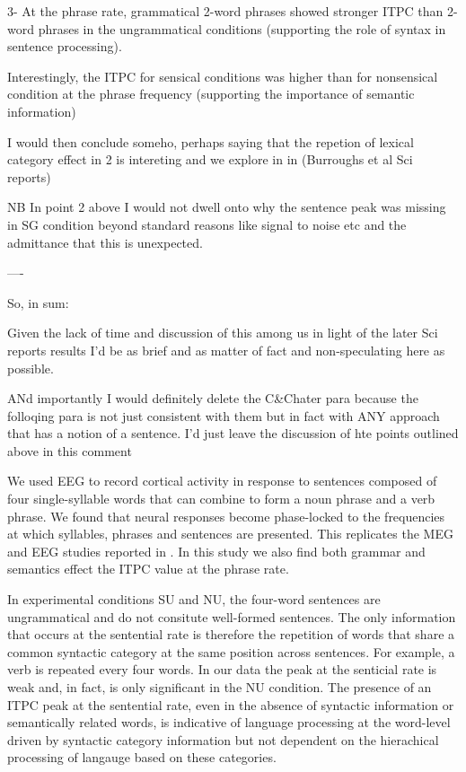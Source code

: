 \documentclass[a4paper,10pt,twoside]{article}
\begin{document}
{3- At the phrase rate, grammatical 2-word
phrases showed stronger ITPC than 2-word phrases in the ungrammatical
conditions (supporting the role of syntax in sentence
processing).

Interestingly, the ITPC for sensical conditions was higher than for
nonsensical condition at the phrase frequency (supporting the
importance of semantic information)

I would then conclude someho,
perhaps saying that the repetion of lexical category effect in 2 is
intereting and we explore in in (Burroughs et al Sci reports)

NB In
point 2 above I would not dwell onto why the sentence peak was missing
in SG condition beyond standard reasons like signal to noise etc and
the admittance that this is unexpected.

----

So, in
sum:

Given the lack of time and discussion of this among us in
light of the later Sci reports results I'd be as brief and as matter
of fact and non-speculating here as possible. 

ANd importantly I
would definitely delete the C&Chater para because the folloqing para
is not just consistent with them but in fact with ANY approach that
has a notion of a sentence.  I'd just leave the discussion of hte
points outlined above in this comment





We used EEG to record cortical activity in response to sentences
composed of four single-syllable words that can combine to form a noun
phrase and a verb phrase. We found that neural responses become
phase-locked to the frequencies at which syllables, phrases and
sentences are presented. This replicates the MEG and EEG studies
reported in \cite{DingEtAl2015,DingEtAl2017}. In this study we also
find both grammar and semantics effect the ITPC value at the phrase
rate.

In experimental conditions SU and NU, the four-word sentences are
ungrammatical and do not consitute well-formed sentences. The only
information that occurs at the sentential rate is therefore the
repetition of words that share a common syntactic category at the same
position across sentences. For example, a verb is repeated every four
words. In our data the peak at the senticial rate is weak and, in
fact, is only significant in the NU condition. The presence of an ITPC
peak at the sentential rate, even in the absence of syntactic
information or semantically related words, is indicative of language
processing at the word-level driven by syntactic category information
but not dependent on the hierachical processing of langauge based on
these categories.

}
\end{document}
